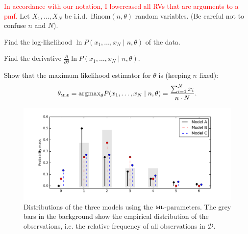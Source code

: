 \documentclass[a4paper,10pt,landscape,twocolumn]{scrartcl}
\newcommand{\philip}[1]{\textcolor{red}{#1}}
\begin{document}
\begin{exercise}
	\philip{In accordance with our notation, I lowercased all RVs that are arguments to a pmf.}
	Let $X_1, \dots, X_N$ be i.i.d.\ $\text{Binom}(n, \theta)$ random variables. 
	(Be careful not to confuse $n$ and $N$).
	
	\begin{subex}[0.5pt]
	Find the log-likelihood $\ln P(x_1, \dots, x_N \mid n, \theta)$ of the data.
	\end{subex}
	
	\begin{subex}[0.5pt]
		Find the derivative $\frac{\partial}{\partial \theta} \ln P(x_1, \dots, x_N \mid n, \theta)$.
	\end{subex}
	
	\begin{subex}[1pt]
		Show that the maximum likelihood estimator for $\theta$ is (keeping $n$ fixed):
		\[
			\theta_\textsc{mle} = \text{argmax}_\theta P(x_1, \dots, x_N \mid n, \theta) = \frac{\sum_{i=1}^N x_i}{n \cdot N}.
		\] 
	\end{subex}
	
\end{exercise}

\begin{figure}
	\includegraphics[width=.5\textwidth]{media/05-distributions}
	\caption{Distributions of the three models using the $\textsc{ml}$-parameters. The grey bars in the background show the empirical distribution of the observations, i.e. the relative frequency of all observations in $\mathcal{D}$.\label{fig:models}}
\end{figure}
\end{document}
